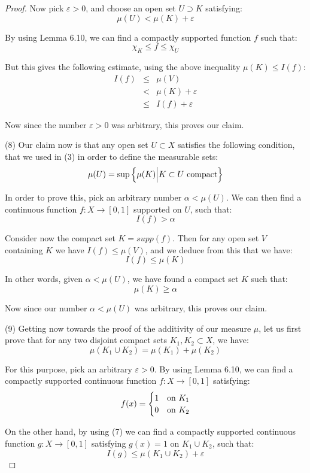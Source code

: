 \documentclass[12pt]{amsbook}
\begin{document}
\begin{proof}
Now pick $\varepsilon>0$, and choose an open set $U\supset K$ satisfying:
$$\mu(U)<\mu(K)+\varepsilon$$

By using Lemma 6.10, we can find a compactly supported function $f$ such that:
$$\chi_K\leq f\leq\chi_U$$ 

But this gives the following estimate, using the above inequality $\mu(K)\leq I(f)$:
\begin{eqnarray*}
I(f)
&\leq&\mu(V)\\
&<&\mu(K)+\varepsilon\\
&\leq&I(f)+\varepsilon
\end{eqnarray*}

Now since the number $\varepsilon>0$ was arbitrary, this proves our claim.

\medskip

(8) Our claim now is that any open set $U\subset X$ satisfies the following condition, that we used in (3) in order to define the measurable sets:
$$\mu(U)=\sup\left\{\mu(K)\Big| K\subset U\ {\rm compact}\right\}$$

In order to prove this, pick an arbitrary number $\alpha<\mu(U)$. We can then find a continuous function $f:X\to[0,1]$ supported on $U$, such that:
$$I(f)>\alpha$$

Consider now the compact set $K=supp(f)$. Then for any open set $V$ containing $K$ we have $I(f)\leq\mu(V)$, and we deduce from this that we have:
$$I(f)\leq\mu(K)$$

In other words, given $\alpha<\mu(U)$, we have found a compact set $K$ such that:
$$\mu(K)\geq\alpha$$

Now since our number $\alpha<\mu(U)$ was arbitrary, this proves our claim.

\medskip

(9) Getting now towards the proof of the additivity of our measure $\mu$, let us first prove that for any two disjoint compact sets $K_1,K_2\subset X$, we have:
$$\mu(K_1\cup K_2)=\mu(K_1)+\mu(K_2)$$

For this purpose, pick an arbitrary $\varepsilon>0$. By using Lemma 6.10, we can find a compactly supported continuous function $f:X\to[0,1]$ satisfying:
$$f(x)=\begin{cases}
1&{\rm on}\ K_1\\
0&{\rm on}\ K_2
\end{cases}$$

On the other hand, by using (7) we can find a compactly supported continuous function $g:X\to[0,1]$ satisfying $g(x)=1$ on $K_1\cup K_2$, such that:
$$I(g)\leq\mu(K_1\cup K_2)+\varepsilon$$


\end{proof}
\end{document}
